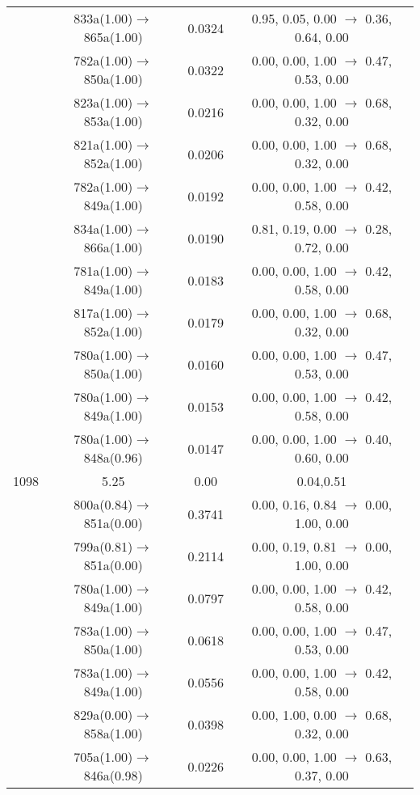 \documentclass[10pt,a4paper]{article}
\begin{document}
\begin{longtable}{c|c|c|c}
 	& 833a(1.00)$\rightarrow$865a(1.00) &	 0.0324 &	 0.95, 0.05, 0.00 $\rightarrow$ 0.36, 0.64, 0.00 \\ 
 	& 782a(1.00)$\rightarrow$850a(1.00) &	 0.0322 &	 0.00, 0.00, 1.00 $\rightarrow$ 0.47, 0.53, 0.00 \\ 
 	& 823a(1.00)$\rightarrow$853a(1.00) &	 0.0216 &	 0.00, 0.00, 1.00 $\rightarrow$ 0.68, 0.32, 0.00 \\ 
 	& 821a(1.00)$\rightarrow$852a(1.00) &	 0.0206 &	 0.00, 0.00, 1.00 $\rightarrow$ 0.68, 0.32, 0.00 \\ 
 	& 782a(1.00)$\rightarrow$849a(1.00) &	 0.0192 &	 0.00, 0.00, 1.00 $\rightarrow$ 0.42, 0.58, 0.00 \\ 
 	& 834a(1.00)$\rightarrow$866a(1.00) &	 0.0190 &	 0.81, 0.19, 0.00 $\rightarrow$ 0.28, 0.72, 0.00 \\ 
 	& 781a(1.00)$\rightarrow$849a(1.00) &	 0.0183 &	 0.00, 0.00, 1.00 $\rightarrow$ 0.42, 0.58, 0.00 \\ 
 	& 817a(1.00)$\rightarrow$852a(1.00) &	 0.0179 &	 0.00, 0.00, 1.00 $\rightarrow$ 0.68, 0.32, 0.00 \\ 
 	& 780a(1.00)$\rightarrow$850a(1.00) &	 0.0160 &	 0.00, 0.00, 1.00 $\rightarrow$ 0.47, 0.53, 0.00 \\ 
 	& 780a(1.00)$\rightarrow$849a(1.00) &	 0.0153 &	 0.00, 0.00, 1.00 $\rightarrow$ 0.42, 0.58, 0.00 \\ 
 	& 780a(1.00)$\rightarrow$848a(0.96) &	 0.0147 &	 0.00, 0.00, 1.00 $\rightarrow$ 0.40, 0.60, 0.00 \\ 
 \hline1098 &	 5.25 &	 0.00 &	 0.04,0.51 \\ 
  	& 800a(0.84)$\rightarrow$851a(0.00) &	 0.3741 &	 0.00, 0.16, 0.84 $\rightarrow$ 0.00, 1.00, 0.00 \\ 
 	& 799a(0.81)$\rightarrow$851a(0.00) &	 0.2114 &	 0.00, 0.19, 0.81 $\rightarrow$ 0.00, 1.00, 0.00 \\ 
 	& 780a(1.00)$\rightarrow$849a(1.00) &	 0.0797 &	 0.00, 0.00, 1.00 $\rightarrow$ 0.42, 0.58, 0.00 \\ 
 	& 783a(1.00)$\rightarrow$850a(1.00) &	 0.0618 &	 0.00, 0.00, 1.00 $\rightarrow$ 0.47, 0.53, 0.00 \\ 
 	& 783a(1.00)$\rightarrow$849a(1.00) &	 0.0556 &	 0.00, 0.00, 1.00 $\rightarrow$ 0.42, 0.58, 0.00 \\ 
 	& 829a(0.00)$\rightarrow$858a(1.00) &	 0.0398 &	 0.00, 1.00, 0.00 $\rightarrow$ 0.68, 0.32, 0.00 \\ 
 	& 705a(1.00)$\rightarrow$846a(0.98) &	 0.0226 &	 0.00, 0.00, 1.00 $\rightarrow$ 0.63, 0.37, 0.00 \\ 

\end{longtable}
\end{document}
